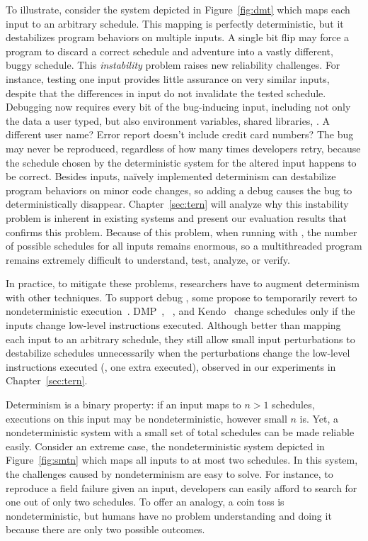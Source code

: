 To illustrate, consider the system depicted in
Figure~\ref{fig:dmt} which maps each input to an arbitrary schedule. This
mapping is perfectly deterministic, but it destabilizes program
behaviors on multiple inputs.  A single bit flip may force a program to
discard a correct schedule and adventure into a vastly different, buggy
schedule. This \emph{instability} problem raises new reliability challenges. 
For instance, testing one input provides little assurance on very similar
inputs, despite that the differences in input do not invalidate the tested
schedule. Debugging now requires every bit of the bug-inducing input, including
not only the data a user typed, but also environment variables, shared
libraries, \etc. A different user name?  Error report doesn't include credit
card numbers? The bug may never be reproduced, regardless of how many times
developers retry, because the schedule chosen by the deterministic system for
the altered input happens to be correct. Besides inputs, na\"{i}vely implemented
determinism can destabilize program behaviors on minor code changes, so adding a
debug  causes the bug to deterministically disappear.
Chapter~\ref{sec:tern} will analyze why this instability problem is
inherent in existing \dmt systems and present our evaluation results
that confirms this problem. Because of this problem, when running with
\dmt, the number of possible schedules for all inputs remains enormous, so a
multithreaded program remains extremely difficult to understand, test, analyze,
or verify.

In practice, to mitigate these problems, researchers have to augment
determinism with other techniques.  To support debug , some
propose to temporarily revert to nondeterministic
execution~\cite{dmp:asplos09}.  DMP~\cite{dmp:asplos09},
\coredet~\cite{coredet:asplos10}, and Kendo~\cite{kendo:asplos09} change
schedules only if the inputs change low-level instructions executed.
Although better than mapping each input to an arbitrary schedule, they
still allow small input perturbations to destabilize schedules
unnecessarily when the perturbations change the low-level instructions
executed (\eg, one extra  executed), observed in our
experiments in Chapter~\ref{sec:tern}.

 Determinism
is a binary property: if an input maps to $n > 1$ schedules, executions on this
input may be nondeterministic, however small $n$ is.  Yet, a nondeterministic
system with a small set of total schedules can be made reliable easily. 
Consider an extreme case, the nondeterministic system depicted in
Figure~\ref{fig:smtn} which maps all inputs to at most two schedules.  In this
system, the challenges caused by nondeterminism are
easy to solve.  For instance, to reproduce a field failure given an input,
developers can easily afford to search for one out of only two schedules.
To offer an analogy, a coin toss is nondeterministic, but humans have
no problem understanding and doing it because there are only two possible
outcomes.

